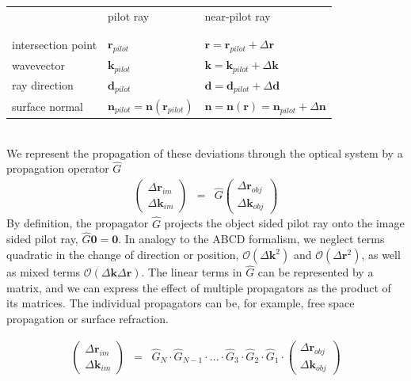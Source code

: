 \documentclass[12pt,a4paper,twoside,openright,BCOR10mm,headsepline,titlepage,abstracton,chapterprefix,final]{scrreprt}
\newcommand\Vector[1]{{\mathbf{#1}}}
\newcommand\wavenumber{k}
\newcommand\Wavevector{\Vector{\wavenumber}}
\newcommand{\orderof}[1]{\mathcal{O}(#1)}
\begin{document}
\begin{tabular}{ l | l | l }
		    & pilot ray & near-pilot ray \\
& & \\ \hline & & \\
intersection point  & $\Vector{r}_{pilot}$ & ${\Vector{r}} = \Vector{r}_{pilot} + \Delta\Vector{r}$ \\
wavevector  & $\Wavevector_{pilot}$ & ${\Wavevector} = \Wavevector_{pilot} + \Delta\Wavevector$ \\
ray direction  & $\Vector{d}_{pilot}$ & ${\Vector{d}} = \Vector{d}_{pilot} + \Delta\Vector{d}$ \\
surface normal      & $\Vector{n}_{pilot} = \Vector{n}(\Vector{r}_{pilot})$ & ${\Vector{n}} = \Vector{n}({\Vector{r}}) = \Vector{n}_{pilot} + \Delta\Vector{n}$ \\
\end{tabular}\\[2ex]
We represent the propagation of these deviations through the optical system by a propagation operator $\hat{G}$
\begin{eqnarray}
 \begin{pmatrix}
  \Delta \Vector{r}_{im} \\ \Delta \Wavevector_{im}
 \end{pmatrix}
 &=&
 \hat{G}
 \begin{pmatrix}
  \Delta \Vector{r}_{obj} \\ \Delta \Wavevector_{obj}
 \end{pmatrix}
\end{eqnarray}
By definition, the propagator $\hat{G}$ projects the object sided pilot ray onto the image sided pilot ray,
$\hat{G}\Vector{0} = \Vector{0}$.
In analogy to the ABCD formalism, we neglect terms quadratic in the change of direction or position, 
$\orderof{\Delta\Wavevector^2}$ and $\orderof{\Delta\Vector{r}^2}$, as well as mixed terms $\orderof{\Delta\Wavevector\Delta\Vector{r}}$.
The linear terms in $\hat{G}$ can be represented by a matrix,
and we can express the effect of multiple propagators as the product of its matrices.
The individual propagators can be, for example, free space propagation or surface refraction.

\begin{eqnarray}
 \begin{pmatrix}
  \Delta \Vector{r}_{im} \\ \Delta \Wavevector_{im}
 \end{pmatrix}
 &=&
 \hat{G}_N \cdot \hat{G}_{N-1} \cdot ... \cdot \hat{G}_3 \cdot \hat{G}_2 \cdot \hat{G}_1 \cdot
 \begin{pmatrix}
  \Delta \Vector{r}_{obj} \\ \Delta \Wavevector_{obj}
 \end{pmatrix}
\end{eqnarray}
\end{document}
